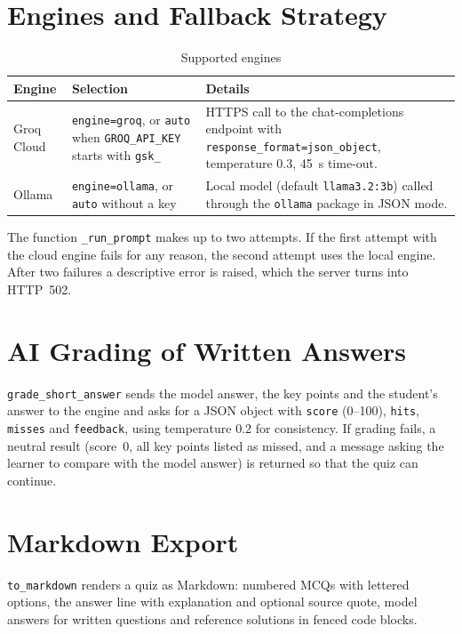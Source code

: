 \section{Engines and Fallback Strategy}
\begin{table}[H]
\centering
\begin{tabularx}{\textwidth}{@{} p{2.4cm} p{4.4cm} X @{}}
\toprule
\textbf{Engine} & \textbf{Selection} & \textbf{Details} \\
\midrule
Groq Cloud & \texttt{engine=groq}, or \texttt{auto} when \texttt{GROQ\_API\_KEY} starts with \texttt{gsk\_} & HTTPS call to the chat-completions endpoint with \texttt{response\_format=json\_object}, temperature 0.3, 45~s time-out. \\
Ollama & \texttt{engine=ollama}, or \texttt{auto} without a key & Local model (default \texttt{llama3.2:3b}) called through the \texttt{ollama} package in JSON mode. \\
\bottomrule
\end{tabularx}
\caption{Supported engines}
\label{tab:engines}
\end{table}
The function \texttt{\_run\_prompt} makes up to two attempts. If the first attempt with the cloud engine fails for any reason, the second attempt uses the local engine. After two failures a descriptive error is raised, which the server turns into HTTP~502.

\section{AI Grading of Written Answers}
\texttt{grade\_short\_answer} sends the model answer, the key points and the student's answer to the engine and asks for a JSON object with \texttt{score} (0--100), \texttt{hits}, \texttt{misses} and \texttt{feedback}, using temperature 0.2 for consistency. If grading fails, a neutral result (score~0, all key points listed as missed, and a message asking the learner to compare with the model answer) is returned so that the quiz can continue.

\section{Markdown Export}
\texttt{to\_markdown} renders a quiz as Markdown: numbered MCQs with lettered options, the answer line with explanation and optional source quote, model answers for written questions and reference solutions in fenced code blocks.



